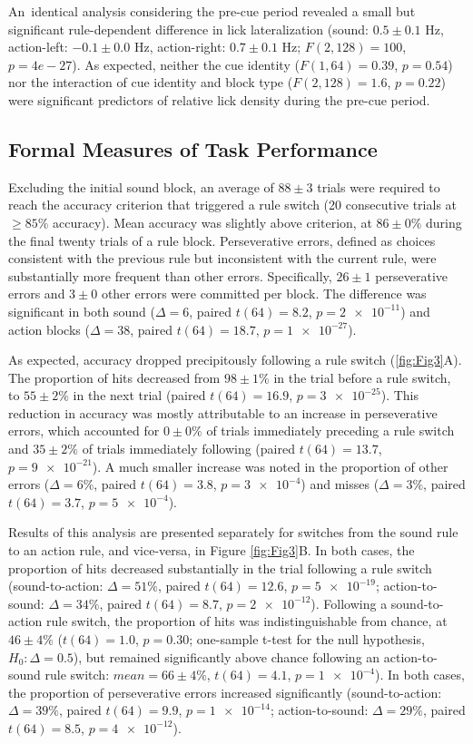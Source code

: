 An\ identical analysis considering the pre-cue period revealed a small but significant  rule-dependent difference in lick lateralization (sound: $0.5 \pm 0.1$ Hz, action-left: $-0.1 \pm 0.0$ Hz, action-right: $0.7 \pm 0.1$ Hz; $F(2,128) =100$, $p=4e-27$). As expected, neither the cue identity ($F(1,64) =0.39$, $p=0.54$) nor the interaction of cue identity and block type ($F(2,128) =1.6$, $p=\num{0.22}$) were significant predictors of relative lick density during the pre-cue period.

\subsection*{Formal Measures of Task Performance}
Excluding the initial sound block, an average of $88 \pm 3$ trials were required to reach the accuracy criterion that triggered a rule switch (20 consecutive trials at $ \geq 85\%$ accuracy). Mean accuracy was slightly above criterion, at $86 \pm 0 \%$ during the final twenty trials of a rule block. Perseverative errors, defined as choices consistent with the previous rule but inconsistent with the current rule, were substantially more frequent than other errors. Specifically, $26 \pm 1$ perseverative errors and $3 \pm 0$ other errors were committed per block. The difference was significant in both sound ($\Delta=6$, paired $t(64) =8.2$, $p=\num{2e-11}$) and action blocks ($\Delta=38$, paired $t(64) =18.7$, $p=\num{1e-27}$).



As expected, accuracy dropped precipitously following a rule switch (\ref{fig:Fig3}A). The proportion of hits decreased from $98 \pm 1 \%$ in the trial before a rule switch, to $55 \pm 2 \%$ in the next trial (paired $t(64) =16.9$, $p=\num{3e-25}$). This reduction in accuracy was mostly attributable to an increase in perseverative errors, which accounted for $0 \pm 0 \%$ of trials immediately preceding a rule switch and $35 \pm 2 \%$ of trials immediately following (paired $t(64) =13.7$, $p=\num{9e-21}$). A much smaller increase was noted in the proportion of other errors ($\Delta=6\%$, paired $t(64) =3.8$, $p=\num{3e-4}$) and misses ($\Delta=3\%$, paired $t(64) =3.7$, $p=\num{5e-4}$). 

Results of this analysis are presented separately for switches from the sound rule to an action rule, and vice-versa, in Figure \ref{fig:Fig3}B. In both cases, the proportion of hits decreased substantially in the trial following a rule switch (sound-to-action: $\Delta=51\%$, paired $t(64) =12.6$, $p=\num{5e-19}$; action-to-sound: $\Delta=34\%$, paired $t(64) =8.7$, $p=\num{2e-12}$). Following a sound-to-action rule switch, the proportion of hits was indistinguishable from chance, at $46 \pm 4 \%$ ($t(64)=1.0$, $p=0.30$; one-sample t-test for the null hypothesis, $H_0:\Delta=0.5$), but remained significantly above chance following an action-to-sound rule switch: $mean=66 \pm 4 \%$, $t(64)=4.1$, $p=\num{1e-4}$). In both cases, the proportion of perseverative errors increased significantly (sound-to-action: $\Delta=39\%$, paired $t(64) =9.9$, $p=\num{1e-14}$; action-to-sound: $\Delta=29\%$, paired $t(64) =8.5$, $p=\num{4e-12}$).  

